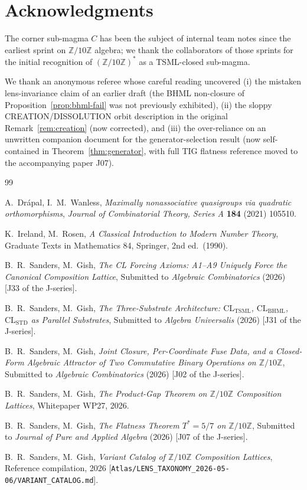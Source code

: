 \documentclass[11pt,reqno]{amsart}
\theoremstyle{plain}
\theoremstyle{definition}
\theoremstyle{remark}
\newcommand{\Z}{\mathbb{Z}}
\newcommand{\TSML}{\mathrm{TSML}}
\newcommand{\BHML}{\mathrm{BHML}}
\begin{document}
\section*{Acknowledgments}

The corner sub-magma $C$ has been the subject of internal team notes
since the earliest sprint on $\Z/10\Z$ algebra; we thank the
collaborators of those sprints for the initial recognition of
$(\Z/10\Z)^*$ as a TSML-closed sub-magma.

We thank an anonymous referee whose careful reading uncovered (i) the
mistaken lens-invariance claim of an earlier draft (the BHML
non-closure of Proposition~\ref{prop:bhml-fail} was not previously
exhibited), (ii) the sloppy CREATION/DISSOLUTION orbit description
in the original Remark~\ref{rem:creation} (now corrected), and
(iii) the over-reliance on an unwritten companion document for the
generator-selection result (now self-contained in
Theorem~\ref{thm:generator}, with full TIG flatness reference moved
to the accompanying paper \cite{SandersTIG} J07).

\begin{thebibliography}{99}

A.~Drápal, I.~M.~Wanless,
\emph{Maximally nonassociative quasigroups via quadratic orthomorphisms},
\emph{Journal of Combinatorial Theory, Series A} \textbf{184} (2021)
105510.

K.~Ireland, M.~Rosen,
\emph{A Classical Introduction to Modern Number Theory},
Graduate Texts in Mathematics 84, Springer, 2nd ed.\ (1990).

B.~R.~Sanders, M.~Gish,
\emph{The CL Forcing Axioms: A1--A9 Uniquely Force the Canonical Composition Lattice},
Submitted to \emph{Algebraic Combinatorics} (2026)
[J33 of the J-series].

B.~R.~Sanders, M.~Gish,
\emph{The Three-Substrate Architecture: $\mathrm{CL}_\TSML$, $\mathrm{CL}_\BHML$, $\mathrm{CL}_\mathrm{STD}$ as Parallel Substrates},
Submitted to \emph{Algebra Universalis} (2026)
[J31 of the J-series].

B.~R.~Sanders, M.~Gish,
\emph{Joint Closure, Per-Coordinate Fuse Data, and a Closed-Form Algebraic Attractor of Two Commutative Binary Operations on $\Z/10\Z$},
Submitted to \emph{Algebraic Combinatorics} (2026)
[J02 of the J-series].

B.~R.~Sanders, M.~Gish,
\emph{The Product-Gap Theorem on $\Z/10\Z$ Composition Lattices},
Whitepaper WP27, 2026.

B.~R.~Sanders, M.~Gish,
\emph{The Flatness Theorem $T^* = 5/7$ on $\Z/10\Z$},
Submitted to \emph{Journal of Pure and Applied Algebra} (2026)
[J07 of the J-series].

B.~R.~Sanders, M.~Gish,
\emph{Variant Catalog of $\Z/10\Z$ Composition Lattices},
Reference compilation, 2026
[\texttt{Atlas/LENS\_TAXONOMY\_2026-05-06/VARIANT\_CATALOG.md}].

\end{thebibliography}
\end{document}
